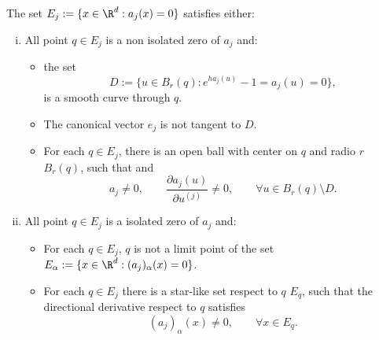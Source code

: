 \begin{hypothesis} \label{ass:HypThmSingularities}
	The set $E_j:=\{x\in \R^{d}: a_j(x)=0\}$ satisfies either:
	\begin{enumerate}[(i)]
		\item
			All point $q \in E_j$ is a non isolated zero of $a_j$ and:
			\begin{itemize}
				\item the set 
					$$
						D:=\{u \in B_r(q): e^{ha_j(u)}-1=a_j(u)= 0\},
					$$ 
					is a smooth curve through $q$. 
				\item
					The canonical vector $e_j$ is not
					tangent to $D$.
				\item
					For each $q \in E_j$, there is an open ball with center
					on $q$ and radio $r$ $B_r(q)$, such that  
					and
					$$
						a_j\neq 0, \qquad
						\frac{\partial a_j(u)}{\partial u^{(j)}} \neq 0 ,\qquad 
						\forall u \in B_r(q)
						\setminus D.
					$$	
			\end{itemize}	
		\item
			All point $q \in E_j$ is a isolated zero of $a_j$ and:
			\begin{itemize}
				\item
					For each $q\in E_j$,  $q$ is not a limit point of the set 
					$E_{\alpha}:=\{x \in \R^d: (a_j)_\alpha(x)=0\}$.
				\item
					For each $q \in E_j$ there is a star-like set respect to $q$ $E_q$, such that
					the directional derivative respect to $q$ satisfies
					$$
						 (a_j)_\alpha(x) \neq 0, \qquad \forall x\in E_q.
					$$
			\end{itemize}		
	\end{enumerate}	
\end{hypothesis}
%
